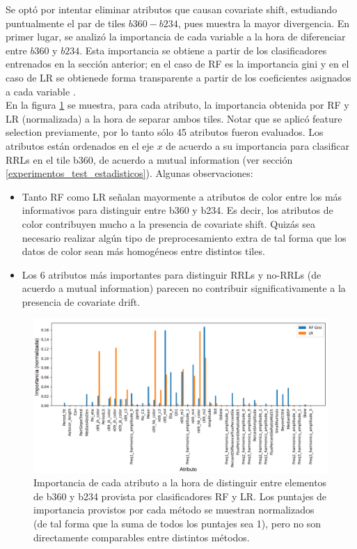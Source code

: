 Se optó por intentar eliminar atributos que causan covariate shift, estudiando puntualmente el par de tiles $b360-b234$, pues muestra la mayor divergencia. En primer lugar, se analizó la importancia de cada variable a la hora de diferenciar entre $b360$ y $b234$. Esta importancia se obtiene a partir de los clasificadores entrenados en la sección anterior; en el caso de RF es la importancia gini y en el caso de LR se obtienede forma transparente a partir de los coeficientes asignados a cada variable \cite{molnar2019}. \\

En la figura \ref{fig:covariate_ranking} se muestra, para cada atributo, la importancia obtenida por RF y LR (normalizada) a la hora de separar ambos tiles. Notar que se aplicó feature selection previamente, por lo tanto sólo 45 atributos fueron evaluados. Los atributos están ordenados en el eje $x$ de acuerdo a su importancia para clasificar RRLs en el tile b360, de acuerdo a mutual information (ver sección \ref{experimentos_test_estadisticos}). Algunas observaciones:

\begin{itemize}
\item Tanto RF como LR señalan mayormente a atributos de color entre los más informativos para distinguir entre b360 y b234. Es decir, los atributos de color contribuyen mucho a la presencia de covariate shift. Quizás sea necesario realizar algún tipo de preprocesamiento extra de tal forma que los datos de color sean más homogéneos entre distintos tiles.
\item Los 6 atributos más importantes para distinguir RRLs y no-RRLs (de acuerdo a mutual information) parecen no contribuir significativamente a la presencia de covariate drift.
\end{itemize}

\begin{figure}[h!]
\centering
  \includegraphics[width=\textwidth]{Kap8/shift_scores.png}  
\caption{Importancia de cada atributo a la hora de distinguir entre elementos de b360 y b234 provista por clasificadores RF y LR. Los puntajes de importancia provistos por cada método se muestran normalizados (de tal forma que la suma de todos los puntajes sea 1), pero no son directamente comparables entre distintos métodos.}
\label{fig:covariate_ranking}
\end{figure}

